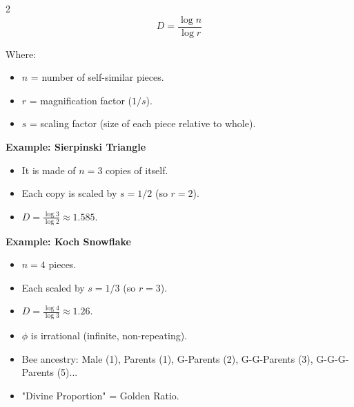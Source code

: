 \documentclass[11pt,letterpaper]{article}
\newcommand{\mysection}[1]{%
        \vspace{-0.3em}
        \colorbox{sectioncolor}{\makebox[\linewidth][l]{\bfseries\color{white}#1}}%
        \vspace{0.3em}
    }
\begin{document}
\begin{multicols*}{2}
    \begin{equation*}
        \boxed{D = \frac{\log n}{\log r}}
    \end{equation*}

    Where:
    \begin{itemize}[leftmargin=*, noitemsep, topsep=0pt]
        \item $n$ = number of self-similar pieces.
        \item $r$ = magnification factor ($1/s$).
        \item $s$ = scaling factor (size of each piece relative to whole).
    \end{itemize}

    \textbf{Example: Sierpinski Triangle}
    \begin{itemize}[leftmargin=*, noitemsep, topsep=0pt]
        \item It is made of $n=3$ copies of itself.
        \item Each copy is scaled by $s=1/2$ (so $r=2$).
        \item $D = \frac{\log 3}{\log 2} \approx 1.585$.
    \end{itemize}

    \textbf{Example: Koch Snowflake}
    \begin{itemize}[leftmargin=*, noitemsep, topsep=0pt]
        \item $n=4$ pieces.
        \item Each scaled by $s=1/3$ (so $r=3$).
        \item $D = \frac{\log 4}{\log 3} \approx 1.26$.
    \end{itemize}

    \mysection{Reminders}
    \begin{itemize}[leftmargin=*, noitemsep, topsep=0pt]
        \item $\phi$ is irrational (infinite, non-repeating).
        \item Bee ancestry: Male (1), Parents (1), G-Parents (2), G-G-Parents (3), G-G-G-Parents (5)...
        \item "Divine Proportion" = Golden Ratio.
    \end{itemize}

    \end{multicols*}
    
\end{document}

